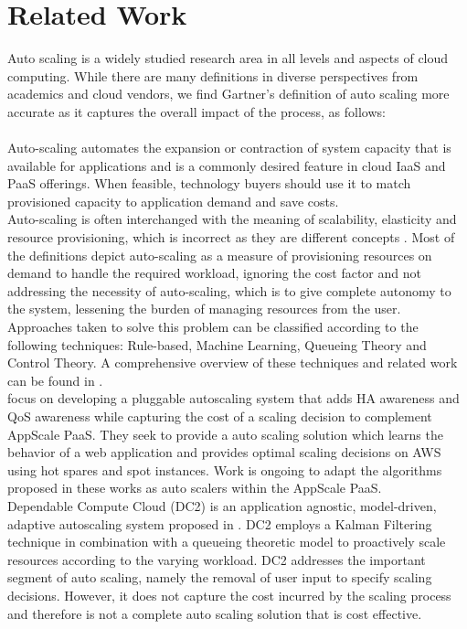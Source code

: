 \section{Related Work}
Auto scaling is a widely studied research area in all levels and aspects of cloud computing. While there are many definitions in diverse perspectives from academics and cloud vendors, we find Gartner’s definition of auto scaling more accurate as it captures the overall impact of the process, as follows:\\\\

Auto-scaling automates the expansion or contraction of system capacity that is available for applications and is a commonly desired feature in cloud IaaS and PaaS offerings. When feasible, technology buyers should use it to match provisioned capacity to application demand and save costs.\cite{website:gartner}\\

Auto-scaling is often interchanged with the meaning of scalability, elasticity and resource provisioning, which is incorrect as they are different concepts \cite{autoscalingissues}. Most of the definitions depict auto-scaling as a measure of provisioning resources on demand to handle the required workload, ignoring the cost factor and not addressing the necessity of auto-scaling, which is to give complete autonomy to the system, lessening the burden  of managing resources from the user. Approaches taken to solve this problem can be classified according to the following techniques: Rule-based, Machine Learning, Queueing Theory and Control Theory. A comprehensive overview of these techniques and related work can be found in \cite{reviewofautoscaling}.\\

\cite{pluggable} focus on developing a pluggable autoscaling system that adds HA awareness and QoS awareness while capturing the cost of a scaling decision to complement AppScale PaaS. They seek to provide a auto scaling solution which learns the behavior of a web application and provides optimal scaling decisions on AWS using hot spares and spot instances. Work is ongoing to adapt the algorithms proposed in these works as auto scalers within the AppScale PaaS.\\

Dependable Compute Cloud (DC2) is an application agnostic, model-driven, adaptive autoscaling system proposed in \cite{modeldriven}. DC2 employs a Kalman Filtering technique in combination with a queueing theoretic model to proactively scale resources according to the varying workload. DC2 addresses the important segment of auto scaling, namely the removal of user input to specify scaling decisions. However, it does not capture the cost incurred by the scaling process and therefore is not a complete auto scaling solution that is cost effective.\\

